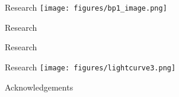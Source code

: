 \documentclass[table]{beamer}
\begin{document}
\begin{frame}{Research}
    \texttt{[image: figures/bp1\_image.png]}
\end{frame}%
\begin{frame}{Research}
\end{frame}%
\begin{frame}{Research}
    \hspace{-0.08\paperwidth}
\end{frame}%
\begin{frame}{Research}
    \texttt{[image: figures/lightcurve3.png]}
\end{frame}%
\begin{frame}{Acknowledgements}
\end{frame}%
\end{document}
